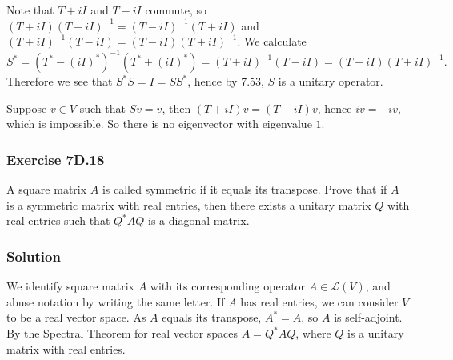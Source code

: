 Note that $T + iI$ and $T - iI$ commute, so $(T + iI)(T - iI)^{-1} = (T - iI)^{-1}(T + iI)$ and $(T + iI)^{-1}(T - iI) = (T - iI)(T + iI)^{-1}$.
We calculate
\begin{equation*}
    S^*
        = (T^* - (iI)^*)^{-1} (T^* + (iI)^*)
        = (T + iI)^{-1} (T - iI)
        = (T - iI) (T + iI)^{-1}.
\end{equation*}
Therefore we see that $S^*S = I = SS^*$, hence by 7.53, $S$ is a unitary operator.

Suppose $v \in V$ such that $Sv = v$, then $(T + iI)v = (T - iI)v$, hence $iv = -iv$, which is impossible.
So there is no eigenvector with eigenvalue $1$.


\subsubsection*{Exercise 7D.18}

A square matrix $A$ is called symmetric if it equals its transpose.
Prove that if $A$ is a symmetric matrix with real entries, then there exists a unitary matrix $Q$ with real entries such that $Q^*AQ$ is a diagonal matrix.

\subsubsection*{Solution}

We identify square matrix $A$ with its corresponding operator $A \in \mathcal{L}(V)$, and abuse notation by writing the same letter.
If $A$ has real entries, we can consider $V$ to be a real vector space.
As $A$ equals its transpose, $A^* = A$, so $A$ is self-adjoint.
By the Spectral Theorem for real vector spaces $A = Q^*AQ$, where $Q$ is a unitary matrix with real entries.
